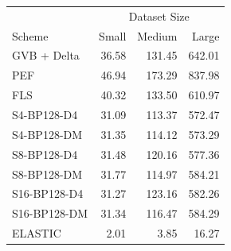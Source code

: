 \begin{tabular}{lrrr}
\toprule
 & \multicolumn{3}{c}{Dataset Size} \\
Scheme & Small & Medium & Large \\
\midrule
GVB + Delta & 36.58 & 131.45 & 642.01 \\
PEF & 46.94 & 173.29 & 837.98 \\
FLS & 40.32 & 133.50 & 610.97 \\
S4-BP128-D4 & 31.09 & 113.37 & 572.47 \\
S4-BP128-DM & 31.35 & 114.12 & 573.29 \\
S8-BP128-D4 & 31.48 & 120.16 & 577.36 \\
S8-BP128-DM & 31.77 & 114.97 & 584.21 \\
S16-BP128-D4 & 31.27 & 123.16 & 582.26 \\
S16-BP128-DM & 31.34 & 116.47 & 584.29 \\
ELASTIC & 2.01 & 3.85 & 16.27 \\
\bottomrule
\end{tabular}
